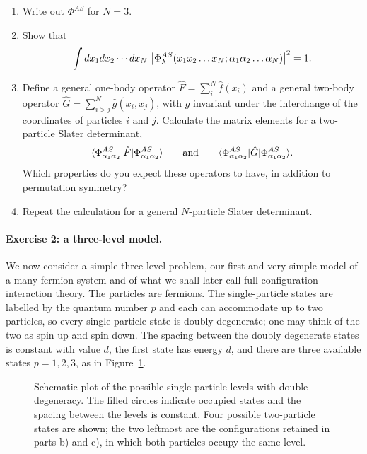 \begin{enumerate}
  \item[a)] Write out $\Phi^{AS}$ for $N=3$.
  \item[b)] Show that
  \[
    \int dx_1dx_2\cdots dx_N\,
    \left|\Phi_{\lambda}^{AS}(x_1x_2\dots x_N;
      \alpha_1\alpha_2\dots\alpha_N)\right|^2 = 1 .
  \]
  \item[c)] Define a general one-body operator
  $\hat{F}=\sum_i^{N}\hat{f}(x_i)$ and a general two-body operator
  $\hat{G}=\sum_{i>j}^{N}\hat{g}(x_i,x_j)$, with $\hat{g}$ invariant under the
  interchange of the coordinates of particles $i$ and $j$.  Calculate the
  matrix elements for a two-particle Slater determinant,
  \[
    \langle \Phi^{AS}_{\alpha_1\alpha_2} | \hat{F} | \Phi^{AS}_{\alpha_1\alpha_2} \rangle
    \qquad\text{and}\qquad
    \langle \Phi^{AS}_{\alpha_1\alpha_2} | \hat{G} | \Phi^{AS}_{\alpha_1\alpha_2} \rangle .
  \]
  Which properties do you expect these operators to have, in addition to
  permutation symmetry?
  \item[d)] Repeat the calculation for a general $N$-particle Slater
  determinant.
\end{enumerate}

\paragraph{Exercise 2: a three-level model.}
We now consider a simple three-level problem, our first and very simple model
of a many-fermion system and of what we shall later call full configuration
interaction theory.  The particles are fermions.  The single-particle states
are labelled by the quantum number $p$ and each can accommodate up to two
particles, so every single-particle state is doubly degenerate; one may think
of the two as spin up and spin down.  The spacing between the doubly
degenerate states is constant with value $d$, the first state has energy $d$,
and there are three available states $p=1,2,3$, as in
Figure~\ref{fig:threelevel}.

\begin{figure}[h]
\centering
{}
\caption{Schematic plot of the possible single-particle levels with double
degeneracy.  The filled circles indicate occupied states and the spacing
between the levels is constant.  Four possible two-particle states are shown;
the two leftmost are the configurations retained in parts b) and c), in which
both particles occupy the same level.}
\label{fig:threelevel}
\end{figure}

